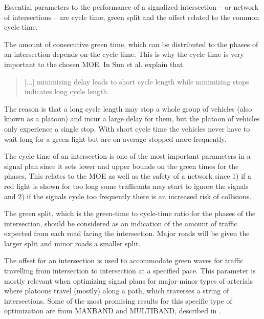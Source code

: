 \label{sec:theproblem}

Essential parameters to the performance of a signalized intersection
-- or network of intersections -- are cycle time, green split and the
offset related to the common cycle time.

The amount of consecutive green time, which can be distributed to the
phases of an intersection depends on the cycle time. This is why the
cycle time is very important to the chosen MOE. In \cite{41} Sun et
al. explain that 

\begin{quote}[...] minimizing delay leads to short cycle length while
minimizing stops indicates long cycle length.
\end{quote}

The reason is that a long cycle length may stop a whole group of
vehicles (also known as a platoon) and incur a large delay for them,
but the platoon of vehicles only experience a single stop. With short
cycle time the vehicles never have to wait long for a green light but
are on average stopped more frequently.


The cycle time of an intersection is one of the most important
parameters in a signal plan since it sets  lower and upper bounds on
the green times for the phases. This relates to the MOE as well as the
safety of a network since 1) if a red light is shown for too long some
trafficants may start to ignore the signals and 2) if the signals
cycle too frequently there is an increased risk of collisions.

The green split, which is the green-time to cycle-time ratio for the
phases of the intersection, should be considered as an indication of
the amount of traffic expected from each road facing the
intersection. Major roads will be given the larger split and minor
roads a smaller split.

The offset for an intersection is used to accommodate green waves for
traffic travelling from intersection to intersection at a specified
pace. This parameter is mostly relevant when optimizing signal plans
for major-minor types of arterials where platoons travel (mostly)
along a path, which traverses a string of intersections. Some of the
most promising results for this specific type of optimization are from
MAXBAND and MULTIBAND, described in \cite{37}.

